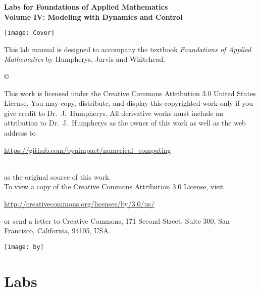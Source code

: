 \documentclass[nociteref]{SIAM-GH-book}
\begin{document}

\thispagestyle{empty} %

\begin{center}
{\huge \bf Labs for Foundations of Applied Mathematics} \\
\vspace{5mm}
{\Large \bf Volume IV: Modeling with Dynamics and Control}
\vspace{20mm}

\texttt{[image: Cover]}
\end{center}
\frontmatter



\begin{thepreface} %

This lab manual is designed to accompany the textbook \emph{Foundations of Applied Mathematics} by Humpherys, Jarvis and Whitehead.

\vfill
\copyright{This work is licensed under the Creative Commons Attribution 3.0 United States 
License.  You may copy, distribute, and display this copyrighted work only if you give 
credit to Dr.~J.~Humpherys. All derivative works must include an attribution to Dr.~J.~Humpherys as the owner of this work as well as the web address to 
\\\centerline{\url{https://github.com/byuimpact/numerical_computing}}\\ as the original source of 
this 
work.\\To view a copy of the Creative Commons Attribution 3.0 License, 
visit\\\centerline{\url{http://creativecommons.org/licenses/by/3.0/us/}} or send a letter to 
Creative Commons, 171 Second Street, Suite 300, San Francisco, California, 94105, USA.}

\vfill
\centering\texttt{[image: by]}
\vfill
\end{thepreface}

\setcounter{tocdepth}{1}
\tableofcontents

\mainmatter


\part{Labs}
\end{document}

